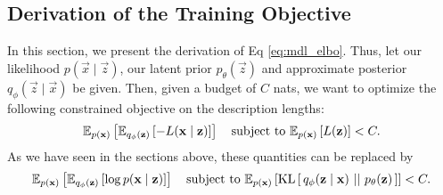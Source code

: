 \subsection{Derivation of the Training Objective}
\label{sec:derive_weighted_elbo}
\par
In this section, we present the derivation of Eq \ref{eq:mdl_elbo}. Thus, let our
likelihood $p(\vec{x} \mid \vec{z})$, our latent prior $p_\theta(\vec{z})$ and
approximate posterior $q_\phi(\vec{z} \mid \vec{x})$ be given. Then, given a budget
of $C$ nats, we want to optimize the following constrained objective on the
description lengths:
\[
  \Exp{\Exp{-L(\vec{x} \mid \vec{z})}{q_\phi(\vec{z})}}{p(\vec{x})}
  \quad \text{subject to } \Exp{L(\vec{z})}{p(\vec{x})} < C.
\]
As we have seen in the sections above, these quantities can be replaced by
\begin{equation}
\label{eq:framework_hard_train_target}
\Exp{\Exp{\log p(\vec{x} \mid \vec{z})}{q_\phi(\vec{z})}}{p(\vec{x})}
\quad \text{subject to } \Exp{\KL{q_{\phi}(\vec{z} \mid
    \vec{x})}{p_{\theta}(\vec{z})}}{p(\vec{x})} < C.
\end{equation}

